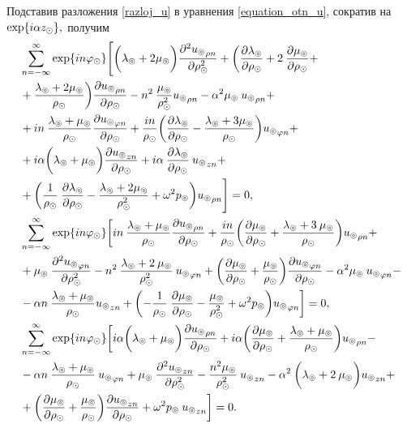 Подставив разложения \eqref{razloj_u} в уравнения \eqref{equation_otn_u}, сократив на $\exp\{i\alpha z_\odot\},$ получим
\begin{equation}\label{system_with_summ}
\begin{aligned}
&\sum\limits_{n=-\infty}^{\infty}\exp\{in\varphi_\odot\}\Biggl[\biggl(\lambda_\circledcirc+2\mu_\circledcirc\biggr)\frac{\partial^2{u_\circledcirc}_{\rho n}}{\partial \rho^2_\odot}+\biggl(\frac{\partial\lambda_\circledcirc}{\partial \rho_\odot}+2\:\frac{\partial\mu_\circledcirc}{\partial \rho_\odot}+\\
&+\frac{\lambda_\circledcirc+2\mu_\circledcirc}{\rho_\odot}\biggr)\frac{\partial {u_\circledcirc}_{\rho n}}{\partial \rho_\odot}-n^2\:\frac{\mu_\circledcirc}{\rho^2_\odot}{u_\circledcirc}_{\rho n}-\alpha^2\mu_\circledcirc\:{u_\circledcirc}_{\rho n}+\\
&+in\:\frac{\lambda_\circledcirc+\mu_\circledcirc}{\rho_\odot}\frac{\partial {u_\circledcirc}_{\varphi n}}{\partial \rho_\odot}+\frac{in}{\rho_\odot}\biggl(\frac{\partial\lambda_\circledcirc}{\partial \rho_\odot}-\frac{\lambda_\circledcirc+3\mu_\circledcirc}{\rho_\odot}\biggr){u_\circledcirc}_{\varphi n}+\\
&+i\alpha\biggl(\lambda_\circledcirc+\mu_\circledcirc\biggr)\frac{\partial {u_\circledcirc}_{z n}}{\partial \rho_\odot}+i\alpha\:\frac{\partial\lambda_\circledcirc}{\partial \rho_\odot}\:{u_\circledcirc}_{z n}+\\
&+\biggl(\frac{1}{\rho_\odot}\:\frac{\partial\lambda_\circledcirc}{\partial \rho_\odot}-\frac{\lambda_\circledcirc+2\mu_\circledcirc}{\rho^2_\odot}+\omega^2 p_\circledcirc\biggr){u_\circledcirc}_{\rho n}\Biggr]=0,\\
&\sum\limits_{n=-\infty}^{\infty}\exp\{in\varphi_\odot\}\biggl[in\:\frac{\lambda_\circledcirc+\mu_\circledcirc}{\rho_\odot}\frac{\partial {u_\circledcirc}_{\rho n}}{\partial \rho_\odot}+\frac{in}{\rho_\odot}\biggl(\frac{\partial\mu_\circledcirc}{\partial \rho_\odot}+\frac{\lambda_\circledcirc+3\:\mu_\circledcirc}{\rho_\odot}\biggr) {u_\circledcirc}_{\rho n}+\\
&+\mu_\circledcirc\:\frac{\partial^2 {u_\circledcirc}_{\varphi n}}{\partial \rho^2_\odot}-n^2\:\frac{\lambda_\circledcirc+2\:\mu_\circledcirc}{\rho^2_\odot}\:{u_\circledcirc}_{\varphi n}+\biggl(\frac{\partial\mu_\circledcirc}{\partial \rho_\odot}+\frac{\mu_\circledcirc}{\rho_\odot}\biggr)\frac{\partial {u_\circledcirc}_{\varphi n}}{\partial \rho_\odot}-\alpha^2\mu_\circledcirc\:{u_\circledcirc}_{\varphi n}-\\
&-\alpha n\:\frac{\lambda_\circledcirc+\mu_\circledcirc}{\rho_\odot}{u_\circledcirc}_{z n}+\biggl(-\frac{1}{\rho_\odot}\:\frac{\partial\mu_\circledcirc}{\partial \rho_\odot}-\frac{\mu_\circledcirc}{\rho^2_\odot}+\omega^2 p_\circledcirc\biggr){u_\circledcirc}_{\varphi n}\biggr]=0,\\
&\sum\limits_{n=-\infty}^{\infty}\exp\{in\varphi_\odot\}\biggl[i\alpha\biggl(\lambda_\circledcirc+\mu_\circledcirc\biggr)\frac{\partial{u_\circledcirc}_{\rho n}}{\partial \rho_\odot}+i\alpha\biggl(\frac{\partial\mu_\circledcirc}{\partial \rho_\odot}+\frac{\lambda_\circledcirc+\mu_\circledcirc}{\rho_\odot}\biggr){u_\circledcirc}_{\rho n}-\\
&-\alpha n\:\frac{\lambda_\circledcirc+\mu_\circledcirc}{\rho_\odot}\:{u_\circledcirc}_{\varphi n}+\mu_\circledcirc\:\frac{\partial^2 {u_\circledcirc}_{z n}}{\partial \rho^2_\odot}-\frac{n^2\mu_\circledcirc}{\rho^2_\odot}\:{u_\circledcirc}_{z n}-\alpha^2\:\biggl(\lambda_\circledcirc+2\:\mu_\circledcirc\biggr){u_\circledcirc}_{z n}+\\
&+\biggl(\frac{\partial\mu_\circledcirc}{\partial \rho_\odot}+\frac{\mu_\circledcirc}{\rho_\odot}\biggr)\frac{\partial {u_\circledcirc}_{z n}}{\partial \rho_\odot}+\omega^2 p_\circledcirc\:{u_\circledcirc}_{z n}\biggr]=0.
\end{aligned}
\end{equation}

